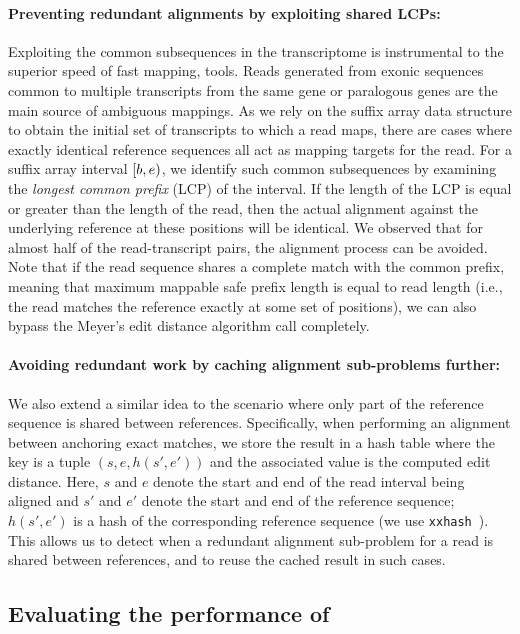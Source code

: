 \paragraph{Preventing redundant alignments by exploiting shared LCPs:}\label{sharedLCP}
Exploiting the common subsequences in the transcriptome is instrumental to the superior speed of fast mapping, 
\nab tools. Reads generated from exonic sequences common to multiple transcripts from the same gene or paralogous 
genes are the main source of ambiguous mappings. As we rely on the suffix array data structure to obtain the 
initial set of transcripts to which a read maps, there are cases where exactly identical reference sequences 
all act as mapping targets for the read. For a suffix array interval $\left[b,e\right)$, we identify such common 
subsequences by examining the {\it longest common prefix} (LCP) of the interval. If the length of the LCP is 
equal or greater than the length of the read, then the actual alignment against the underlying reference at 
these positions will be identical. We observed that for almost half of the read-transcript pairs, the alignment 
process can be avoided. Note that if the read sequence shares a complete match with the common prefix, meaning 
that maximum mappable safe prefix length is equal to read length (i.e., the read matches the reference exactly 
at some set of positions), we can also bypass the Meyer's edit distance algorithm call completely.

\paragraph{Avoiding redundant work by caching alignment sub-problems further:} 
We also extend a similar idea to the 
scenario where only part of the reference sequence is shared between references.  Specifically, when performing an 
alignment between anchoring exact matches, we store the result in a hash table where the key is a tuple 
$\left(s,e,h\left(s', e'\right)\right)$ and the associated value is the computed edit distance.  
Here, $s$ 
and $e$ denote the start and end of the read interval being aligned and 
$s'$ and $e'$ denote the start and 
end of the reference sequence; $h(s',e')$ is a hash of the corresponding reference sequence 
(we use \texttt{xxhash}~\citep{xxhash}).  
This allows us to detect when a redundant alignment sub-problem for 
a read is shared between references, and to reuse the cached result in such cases.


\subsection{Evaluating the performance of \sla}


